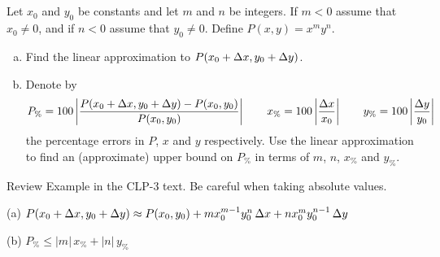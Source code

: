 


\subsection*{\Conceptual}

\begin{question}
Let $x_0$ and $y_0$ be constants and let $m$ and $n$ be integers.
If $m<0$ assume that $x_0\ne 0$, and if $n<0$ assume that $y_0\ne 0$.
Define $P(x,y) = x^m y^n$.
\begin{enumerate}[(a)]
\item
Find the linear approximation to $P(x_0+\Delta x,y_0+\Delta y)$.
\item
Denote by
\begin{equation*}
P_\% = 100\left|\frac{P(x_0+\Delta x,y_0+\Delta y)-P(x_0,y_0)}{P(x_0,y_0)}\right|
\qquad
x_\% = 100\left|\frac{\Delta x}{x_0}\right|
\qquad
y_\% = 100\left|\frac{\Delta y}{y_0}\right|
\end{equation*}
the percentage errors in $P$, $x$ and $y$ respectively. Use the linear approximation to find an (approximate) upper bound on $P_\%$ in terms of
$m$, $n$, $x_\%$ and $y_\%$.
\end{enumerate}

\end{question}

\begin{hint}
Review Example  in the CLP-3 text.
Be careful when taking absolute values.
\end{hint}

\begin{answer}
(a) $P(x_0+\Delta x,y_0+\Delta y) 
       \approx P(x_0,y_0) + mx_0^{m-1}y_0^n\,\Delta x  + nx_0^m y_0^{n-1}\,\Delta y$

(b) $P_\% \le |m|\,x_\% + |n|\,y_\%$
\end{answer}

